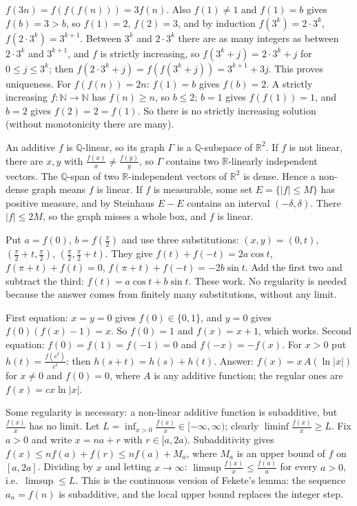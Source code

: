 \documentclass[11pt,a4paper]{article}
\begin{document}
 \(f(3n)=f(f(f(n)))=3f(n)\). Also \(f(1)\ne1\) and \(f(1)=b\) gives \(f(b)=3\gt b\), so \(f(1)=2\), \(f(2)=3\), and by induction \(f(3^k)=2\cdot3^k\), \(f(2\cdot3^k)=3^{k+1}\).
 Between \(3^k\) and \(2\cdot3^k\) there are as many integers as between \(2\cdot3^k\) and \(3^{k+1}\), and \(f\) is strictly increasing, so \(f(3^k+j)=2\cdot3^k+j\) for \(0\le j\le3^k\); then \(f(2\cdot3^k+j)=f(f(3^k+j))=3^{k+1}+3j\). This proves uniqueness.
 For \(f(f(n))=2n\): \(f(1)=b\) gives \(f(b)=2\). A strictly increasing \(f\colon\mathbb N\to\mathbb N\) has \(f(n)\ge n\), so \(b\le2\); \(b=1\) gives \(f(f(1))=1\), and \(b=2\) gives \(f(2)=2=f(1)\). So there is no strictly increasing solution (without monotonicity there are many).

 An additive \(f\) is \(\mathbb Q\)-linear, so its graph \(\Gamma\) is a \(\mathbb Q\)-subspace of \(\mathbb R^2\). If \(f\) is not linear, there are \(x,y\) with \(\frac{f(x)}x\ne\frac{f(y)}y\), so \(\Gamma\) contains two \(\mathbb R\)-linearly independent vectors.
 The \(\mathbb Q\)-span of two \(\mathbb R\)-independent vectors of \(\mathbb R^2\) is dense. Hence a non-dense graph means \(f\) is linear.
 If \(f\) is measurable, some set \(E=\{|f|\le M\}\) has positive measure, and by Steinhaus \(E-E\) contains an interval \((-\delta,\delta)\). There \(|f|\le2M\), so the graph misses a whole box, and \(f\) is linear.

 Put \(a=f(0)\), \(b=f(\frac\pi2)\) and use three substitutions: \((x,y)=(0,t)\), \((\frac\pi2+t,\frac\pi2)\), \((\frac\pi2,\frac\pi2+t)\).
 They give \(f(t)+f(-t)=2a\cos t\), \(f(\pi+t)+f(t)=0\), \(f(\pi+t)+f(-t)=-2b\sin t\). Add the first two and subtract the third: \(f(t)=a\cos t+b\sin t\). These work. No regularity is needed because the answer comes from finitely many substitutions, without any limit.

 First equation: \(x=y=0\) gives \(f(0)\in\{0,1\}\), and \(y=0\) gives \(f(0)(f(x)-1)=x\). So \(f(0)=1\) and \(f(x)=x+1\), which works.
 Second equation: \(f(0)=f(1)=f(-1)=0\) and \(f(-x)=-f(x)\). For \(x\gt0\) put \(h(t)=\frac{f(e^t)}{e^t}\): then \(h(s+t)=h(s)+h(t)\).
 Answer: \(f(x)=x\,A(\ln|x|)\) for \(x\ne0\) and \(f(0)=0\), where \(A\) is any additive function; the regular ones are \(f(x)=cx\ln|x|\).

 Some regularity is necessary: a non-linear additive function is subadditive, but \(\frac{f(x)}x\) has no limit. Let \(L=\inf_{x\gt0}\frac{f(x)}x\in[-\infty,\infty)\); clearly \(\liminf\frac{f(x)}x\ge L\).
 Fix \(a\gt0\) and write \(x=na+r\) with \(r\in[a,2a)\). Subadditivity gives \(f(x)\le nf(a)+f(r)\le nf(a)+M_a\), where \(M_a\) is an upper bound of \(f\) on \([a,2a]\). Dividing by \(x\) and letting \(x\to\infty\): \(\limsup\frac{f(x)}x\le\frac{f(a)}a\) for every \(a\gt0\), i.e.\ \(\limsup\le L\).
 This is the continuous version of Fekete's lemma: the sequence \(a_n=f(n)\) is subadditive, and the local upper bound replaces the integer step.
\end{document}
